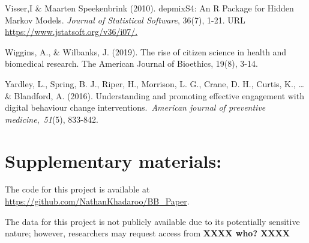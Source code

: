 \documentclass[
]{article}
\begin{document}
Visser,I \& Maarten Speekenbrink (2010). depmixS4: An R Package for
Hidden Markov Models. \emph{Journal of Statistical Software}, 36(7),
1-21. URL \url{https://www.jstatsoft.org/v36/i07/.}

Wiggins, A., \& Wilbanks, J. (2019). The rise of citizen science in
health and biomedical research. The American Journal of Bioethics,
19(8), 3-14.

Yardley, L., Spring, B. J., Riper, H., Morrison, L. G., Crane, D. H.,
Curtis, K., \ldots{} \& Blandford, A. (2016). Understanding and
promoting effective engagement with digital behaviour change
interventions.~\emph{American journal of preventive
medicine},~\emph{51}(5), 833-842.

\hypertarget{supplementary-materials}{%
\section{Supplementary materials:}\label{supplementary-materials}}

The code for this project is available at
\url{https://github.com/NathanKhadaroo/BB_Paper}.

The data for this project is not publicly available due to its
potentially sensitive nature; however, researchers may request access
from \textbf{XXXX who? XXXX}
\end{document}
